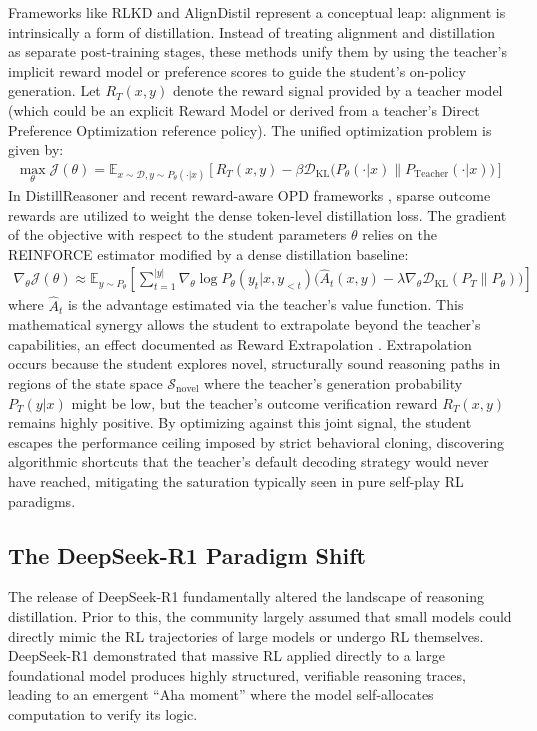 Frameworks like RLKD \citep{2505.16142} and AlignDistil \citep{2503.02832} represent a conceptual leap: alignment is intrinsically a form of distillation. Instead of treating alignment and distillation as separate post-training stages, these methods unify them by using the teacher's implicit reward model or preference scores to guide the student's on-policy generation. Let $R_T(x, y)$ denote the reward signal provided by a teacher model (which could be an explicit Reward Model or derived from a teacher's Direct Preference Optimization reference policy). The unified optimization problem is given by:
\begin{align}
\max_{\theta} \mathcal{J}(\theta) = \mathbb{E}_{x \sim \mathcal{D}, y \sim P_\theta(\cdot|x)} \left[ R_T(x, y) - \beta \mathcal{D}_{\text{KL}}\big(P_\theta(\cdot|x) \parallel P_{\text{Teacher}}(\cdot|x)\big) \right] \label{eq:rlkd}
\end{align}
In DistillReasoner \citep{2408.06037} and recent reward-aware OPD frameworks \citep{2503.04711}, sparse outcome rewards are utilized to weight the dense token-level distillation loss. The gradient of the objective with respect to the student parameters $\theta$ relies on the REINFORCE estimator modified by a dense distillation baseline:
\begin{align}
\nabla_\theta \mathcal{J}(\theta) \approx \mathbb{E}_{y \sim P_\theta} \left[ \sum_{t=1}^{|y|} \nabla_\theta \log P_\theta(y_t | x, y_{<t}) \Big( \hat{A}_t(x, y) - \lambda \nabla_\theta \mathcal{D}_{\text{KL}}(P_T \parallel P_\theta) \Big) \right]
\end{align}
where $\hat{A}_t$ is the advantage estimated via the teacher's value function. This mathematical synergy allows the student to extrapolate beyond the teacher's capabilities, an effect documented as Reward Extrapolation \citep{2602.12125}. Extrapolation occurs because the student explores novel, structurally sound reasoning paths in regions of the state space $\mathcal{S}_{\text{novel}}$ where the teacher's generation probability $P_T(y|x)$ might be low, but the teacher's outcome verification reward $R_T(x, y)$ remains highly positive. By optimizing against this joint signal, the student escapes the performance ceiling imposed by strict behavioral cloning, discovering algorithmic shortcuts that the teacher's default decoding strategy would never have reached, mitigating the saturation typically seen in pure self-play RL paradigms.

\subsection{The DeepSeek-R1 Paradigm Shift}
The release of DeepSeek-R1 \citep{2501.12948} fundamentally altered the landscape of reasoning distillation. Prior to this, the community largely assumed that small models could directly mimic the RL trajectories of large models or undergo RL themselves. DeepSeek-R1 demonstrated that massive RL applied directly to a large foundational model produces highly structured, verifiable reasoning traces, leading to an emergent ``Aha moment'' where the model self-allocates computation to verify its logic. 

